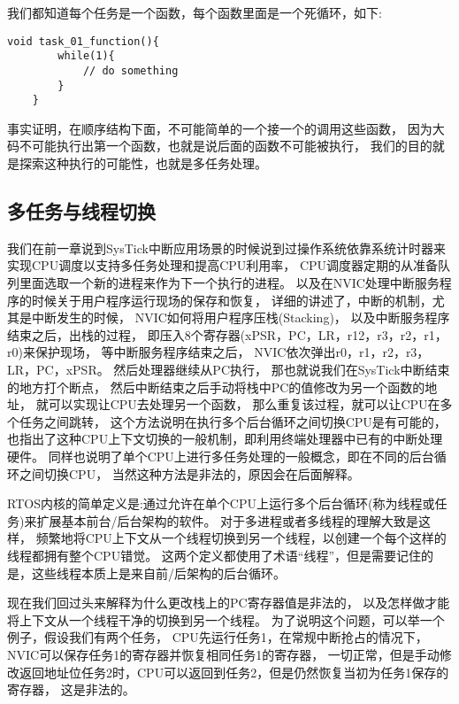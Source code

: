 我们都知道每个任务是一个函数，每个函数里面是一个死循环，如下:
\begin{lstlisting}[language={[ANSI]C},keywordstyle=\color{blue!70},commentstyle=\color{red!50!green!50!blue!50},frame=shadowbox, rulesepcolor=\color{red!20!green!20!blue!20}]
    void task_01_function(){
        while(1){
            // do something
        }
    }
\end{lstlisting}
事实证明，在顺序结构下面，不可能简单的一个接一个的调用这些函数，
因为大码不可能执行出第一个函数，也就是说后面的函数不可能被执行，
我们的目的就是探索这种执行的可能性，也就是多任务处理。

\subsection{多任务与线程切换}
我们在前一章说到SysTick中断应用场景的时候说到过操作系统依靠系统计时器来实现CPU调度以支持多任务处理和提高CPU利用率，
CPU调度器定期的从准备队列里面选取一个新的进程来作为下一个执行的进程。
以及在NVIC处理中断服务程序的时候关于用户程序运行现场的保存和恢复，
详细的讲述了，中断的机制，尤其是中断发生的时候，
NVIC如何将用户程序压栈(Stacking)，
以及中断服务程序结束之后，出栈的过程，
即压入8个寄存器(xPSR，PC，LR，r12，r3，r2，r1，r0)来保护现场，
等中断服务程序结束之后，
NVIC依次弹出r0，r1，r2，r3，LR，PC，xPSR。
然后处理器继续从PC执行，
那也就说我们在SysTick中断结束的地方打个断点，
然后中断结束之后手动将栈中PC的值修改为另一个函数的地址，
就可以实现让CPU去处理另一个函数，
那么重复该过程，就可以让CPU在多个任务之间跳转，
这个方法说明在执行多个后台循环之间切换CPU是有可能的，
也指出了这种CPU上下文切换的一般机制，即利用终端处理器中已有的中断处理硬件。
同样也说明了单个CPU上进行多任务处理的一般概念，即在不同的后台循环之间切换CPU，
当然这种方法是非法的，原因会在后面解释。

RTOS内核的简单定义是:通过允许在单个CPU上运行多个后台循环(称为线程或任务)来扩展基本前台/后台架构的软件。
对于多进程或者多线程的理解大致是这样，
频繁地将CPU上下文从一个线程切换到另一个线程，以创建一个每个这样的线程都拥有整个CPU错觉。
这两个定义都使用了术语“线程”，但是需要记住的是，这些线程本质上是来自前/后架构的后台循环。

现在我们回过头来解释为什么更改栈上的PC寄存器值是非法的，
以及怎样做才能将上下文从一个线程干净的切换到另一个线程。
为了说明这个问题，可以举一个例子，假设我们有两个任务，
CPU先运行任务1，在常规中断抢占的情况下，NVIC可以保存任务1的寄存器并恢复相同任务1的寄存器，
一切正常，但是手动修改返回地址位任务2时，CPU可以返回到任务2，但是仍然恢复当初为任务1保存的寄存器，
这是非法的。

